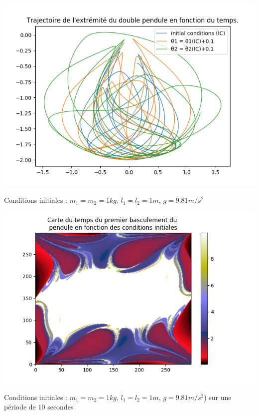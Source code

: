 \begin{minipage}[c]{.46\linewidth}
    \centering
    \includegraphics[width=\linewidth]{images/trace_pendule.png}
    \captionsetup{type=figure}\caption{Conditions initiales : $m_1 = m_2 = 1kg$, $l_1 = l_2 = 1 m$, $g = 9.81m/s^2$}
    \label{fig:trace_double_pendulum}
\end{minipage}
\hfill%
\begin{minipage}[c]{.46\linewidth}
    \centering
    \includegraphics[width=\linewidth]{images/map_time.png}
    \captionsetup{type=figure}\caption{Conditions initiales : $m_1 = m_2 = 1kg$, $l_1 = l_2 = 1 m$, $g = 9.81m/s^2$) sur une période de $10$ secondes}
    \label{fig:map_time}
\end{minipage}
\vspace{4.00mm}

